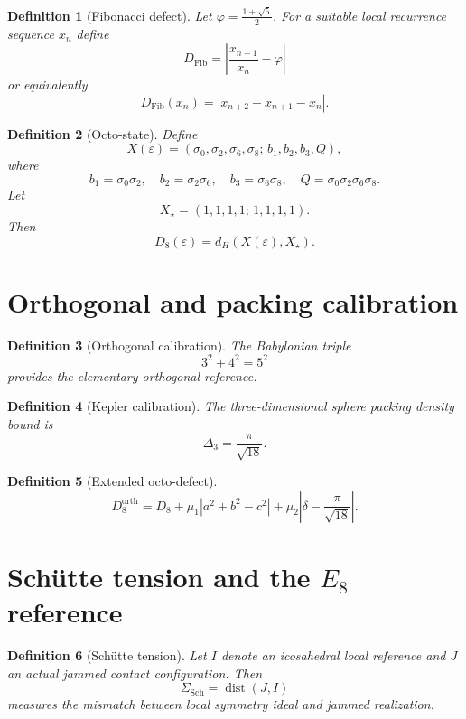 \documentclass[11pt,a4paper]{article}
\newtheorem{definition}{Definition}[section]
\begin{document}
	\begin{definition}[Fibonacci defect]
		Let $\varphi=\frac{1+\sqrt5}{2}$. For a suitable local recurrence sequence $x_n$ define
		\[
		D_{\mathrm{Fib}}=
		\left|
		\frac{x_{n+1}}{x_n}-\varphi
		\right|
		\]
		or equivalently
		\[
		D_{\mathrm{Fib}}(x_n)=|x_{n+2}-x_{n+1}-x_n|.
		\]
	\end{definition}
	
	\begin{definition}[Octo-state]
		Define
		\[
		X(\varepsilon)=
		(\sigma_0,\sigma_2,\sigma_6,\sigma_8;\,b_1,b_2,b_3,Q),
		\]
		where
		\[
		b_1=\sigma_0\sigma_2,\quad
		b_2=\sigma_2\sigma_6,\quad
		b_3=\sigma_6\sigma_8,\quad
		Q=\sigma_0\sigma_2\sigma_6\sigma_8.
		\]
		Let
		\[
		X_\star=(1,1,1,1;\,1,1,1,1).
		\]
		Then
		\[
		D_8(\varepsilon)=d_H(X(\varepsilon),X_\star).
		\]
	\end{definition}
	
	\section{Orthogonal and packing calibration}
	
	\begin{definition}[Orthogonal calibration]
		The Babylonian triple
		\[
		3^2+4^2=5^2
		\]
		provides the elementary orthogonal reference.
	\end{definition}
	
	\begin{definition}[Kepler calibration]
		The three-dimensional sphere packing density bound is
		\[
		\Delta_3=\frac{\pi}{\sqrt{18}}.
		\]
	\end{definition}
	
	\begin{definition}[Extended octo-defect]
		\[
		D_8^{\mathrm{orth}}
		=
		D_8
		+\mu_1|a^2+b^2-c^2|
		+\mu_2\left|\delta-\frac{\pi}{\sqrt{18}}\right|.
		\]
	\end{definition}
	
	\section{Sch\"utte tension and the $E_8$ reference}
	
	\begin{definition}[Sch\"utte tension]
		Let $I$ denote an icosahedral local reference and $J$ an actual jammed contact configuration. Then
		\[
		\Sigma_{\mathrm{Sch}}=\operatorname{dist}(J,I)
		\]
		measures the mismatch between local symmetry ideal and jammed realization.
	\end{definition}
	
\end{document}

